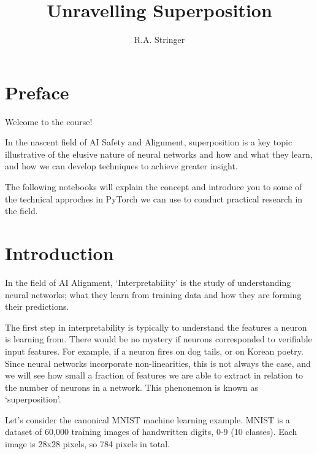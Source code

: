 \documentclass[
  letterpaper,
  DIV=11,
  numbers=noendperiod]{scrreprt}
\title{Unravelling Superposition}
\author{R.A. Stringer}
\date{}
\renewcommand*\contentsname{Table of contents}
\newcommand\contentsname{Table of contents}
\begin{document}
\maketitle

\renewcommand*\contentsname{Table of contents}
{
\hypersetup{linkcolor=}
\setcounter{tocdepth}{2}
\tableofcontents
}


\chapter*{Preface}\label{preface}


Welcome to the course!

In the nascent field of AI Safety and Alignment, superposition is a key
topic illustrative of the elusive nature of neural networks and how and
what they learn, and how we can develop techniques to achieve greater
insight.

The following notebooks will explain the concept and introduce you to
some of the technical approches in PyTorch we can use to conduct
practical research in the field.


\chapter{Introduction}\label{introduction}

In the field of AI Alignment, `Interpretability' is the study of
understanding neural networks; what they learn from training data and
how they are forming their predictions.

The first step in interpretability is typically to understand the
features a neuron is learning from. There would be no mystery if neurons
corresponded to verifiable input features. For example, if a neuron
fires on dog tails, or on Korean poetry. Since neural networks
incorporate non-linearities, this is not always the case, and we will
see how small a fraction of features we are able to extract in relation
to the number of neurons in a network. This phenonemon is known as
`superposition'.

Let's consider the canonical MNIST machine learning example. MNIST is a
dataset of 60,000 training images of handwritten digits, 0-9 (10
classes). Each image is 28x28 pixels, so 784 pixels in total.
\end{document}
